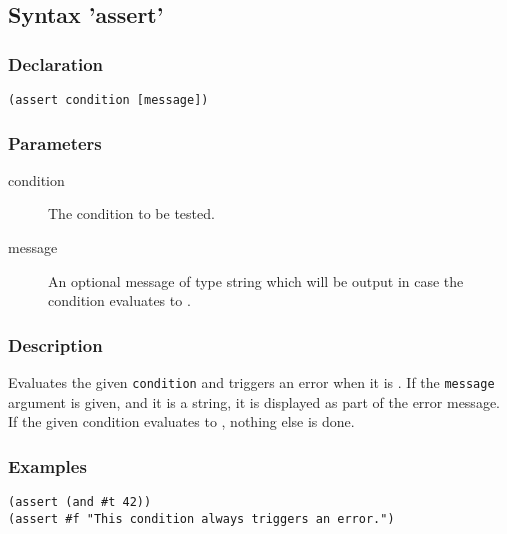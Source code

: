 \subsection{Syntax 'assert'}
\label{builtins/assert}

\subsubsection*{Declaration}
\begin{lstlisting}
(assert condition [message])
\end{lstlisting}

\subsubsection*{Parameters}
\begin{description}
	\item[condition] The condition to be tested.
	\item[message] An optional message of type string which will be output in case the condition evaluates to \false{}.
\end{description}

\subsubsection*{Description}
Evaluates the given \lstinline|condition| and triggers an error when it is \false{}. If the \lstinline|message| argument is given, and it is a string, it is displayed as part of the error message. If the given condition evaluates to \true{}, nothing else is done.

\subsubsection*{Examples}
\begin{lstlisting}
(assert (and #t 42))
(assert #f "This condition always triggers an error.")
\end{lstlisting}
